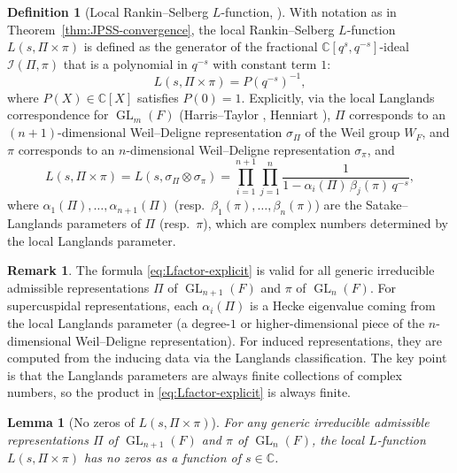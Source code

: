 \documentclass[12pt]{article}
\newtheorem{lemma}[theorem]{Lemma}
\theoremstyle{definition}
\newtheorem{definition}[theorem]{Definition}
\newtheorem{remark}[theorem]{Remark}
\DeclareMathOperator{\GL}{GL}
\begin{document}
\begin{definition}[Local Rankin--Selberg $L$-function, \cite{JPSS83}]
\label{def:Lfactor}
With notation as in Theorem~\ref{thm:JPSS-convergence}, the local
Rankin--Selberg $L$-function $L(s,\Pi\times\pi)$ is defined as the
generator of the fractional $\mathbb{C}[q^s,q^{-s}]$-ideal
$\mathcal{I}(\Pi,\pi)$ that is a polynomial in $q^{-s}$ with constant term $1$:
\begin{equation}
  \label{eq:Lfactor-def}
  L(s,\Pi\times\pi) = P(q^{-s})^{-1},
\end{equation}
where $P(X) \in \mathbb{C}[X]$ satisfies $P(0) = 1$.  Explicitly, via the
local Langlands correspondence for $\GL_m(F)$ (Harris--Taylor \cite{HT01},
Henniart \cite{Hen00}), $\Pi$ corresponds to an $(n+1)$-dimensional Weil--Deligne
representation $\sigma_\Pi$ of the Weil group $W_F$, and $\pi$ corresponds to an
$n$-dimensional Weil--Deligne representation $\sigma_\pi$, and
\begin{equation}
  \label{eq:Lfactor-explicit}
  L(s,\Pi\times\pi)
  = L(s,\sigma_\Pi \otimes \sigma_\pi)
  = \prod_{i=1}^{n+1}\prod_{j=1}^{n}
    \frac{1}{1 - \alpha_i(\Pi)\,\beta_j(\pi)\,q^{-s}},
\end{equation}
where $\alpha_1(\Pi),\ldots,\alpha_{n+1}(\Pi)$ (resp.\
$\beta_1(\pi),\ldots,\beta_n(\pi)$) are the Satake--Langlands parameters of
$\Pi$ (resp.\ $\pi$), which are complex numbers determined by the local
Langlands parameter.
\end{definition}

\begin{remark}
The formula \eqref{eq:Lfactor-explicit} is valid for all generic irreducible
admissible representations $\Pi$ of $\GL_{n+1}(F)$ and $\pi$ of $\GL_n(F)$.
For supercuspidal representations, each $\alpha_i(\Pi)$ is a Hecke eigenvalue
coming from the local Langlands parameter (a degree-$1$ or higher-dimensional
piece of the $n$-dimensional Weil--Deligne representation).  For induced
representations, they are computed from the inducing data via the
Langlands classification.  The key point is that the Langlands parameters
are always finite collections of complex numbers, so the product in
\eqref{eq:Lfactor-explicit} is always finite.
\end{remark}

\begin{lemma}[No zeros of $L(s,\Pi\times\pi)$]
\label{lem:no-zeros}
For any generic irreducible admissible representations $\Pi$ of $\GL_{n+1}(F)$
and $\pi$ of $\GL_n(F)$, the local $L$-function $L(s,\Pi\times\pi)$ has no
zeros as a function of $s \in \mathbb{C}$.
\end{lemma}
\end{document}
